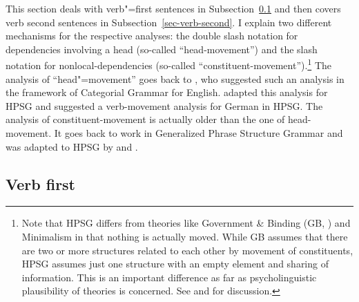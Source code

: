 This section deals with verb"=first sentences in Subsection~\ref{sec-verb-first} and then covers verb
second sentences in Subsection~\ref{sec-verb-second}. I explain two different mechanisms for the
respective analyses: the double slash notation for dependencies involving a head (so-called ``head-movement'') and the slash notation
for nonlocal-dependencies (so-called ``constituent-movement'').\footnote{
  Note that HPSG differs from theories like Government \& Binding (GB, \citealt{Chomsky81a}) and
  Minimalism \citep{Chomsky95a-u} in that nothing is
  actually moved. While GB assumes that there are two or more structures related to each other by
  movement of constituents, HPSG assumes just one structure with an empty element and sharing of
  information. This is an important difference as far as psycholinguistic plausibility of theories
  is concerned. See  and  for discussion.
}
The analysis of ``head"=movement'' goes back to \citet{Jacobson87}, who suggested such an analysis
in the framework of Categorial Grammar for English. \citet{Borsley89} adapted this analysis for HPSG
and \citet{KW91a,Kiss95a,Kiss95b} suggested a verb-movement analysis for German in HPSG. The analysis of
constituent-movement is actually older than the one of head-movement. It goes back to work in
Generalized Phrase Structure Grammar \citep{Gazdar81a} and was adapted to HPSG by \citet[Section~3.4]{ps} and \citet[Chapter~4]{ps2}. 

\subsection{Verb first}
\label{sec-verb-first}

